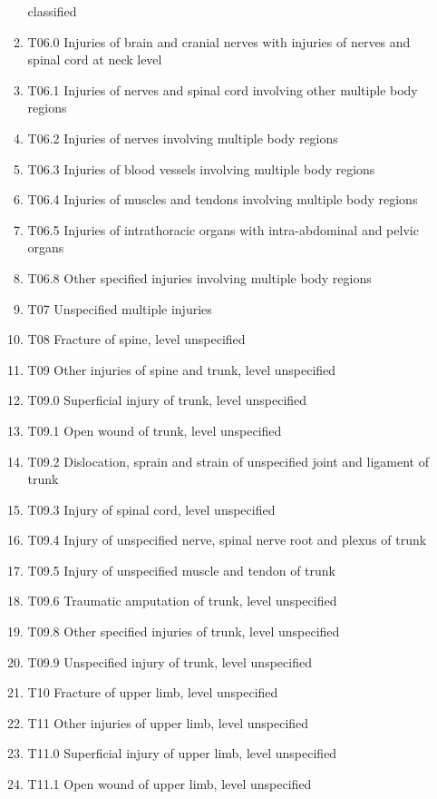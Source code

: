 \documentclass[
]{scrartcl}
\begin{document}
\begin{itemize}
\begin{enumerate}
    classified
  \item
    T06.0 Injuries of brain and cranial nerves with injuries of nerves
    and spinal cord at neck level
  \item
    T06.1 Injuries of nerves and spinal cord involving other multiple
    body regions
  \item
    T06.2 Injuries of nerves involving multiple body regions
  \item
    T06.3 Injuries of blood vessels involving multiple body regions
  \item
    T06.4 Injuries of muscles and tendons involving multiple body
    regions
  \item
    T06.5 Injuries of intrathoracic organs with intra-abdominal and
    pelvic organs
  \item
    T06.8 Other specified injuries involving multiple body regions
  \item
    T07 Unspecified multiple injuries
  \item
    T08 Fracture of spine, level unspecified
  \item
    T09 Other injuries of spine and trunk, level unspecified
  \item
    T09.0 Superficial injury of trunk, level unspecified
  \item
    T09.1 Open wound of trunk, level unspecified
  \item
    T09.2 Dislocation, sprain and strain of unspecified joint and
    ligament of trunk
  \item
    T09.3 Injury of spinal cord, level unspecified
  \item
    T09.4 Injury of unspecified nerve, spinal nerve root and plexus of
    trunk
  \item
    T09.5 Injury of unspecified muscle and tendon of trunk
  \item
    T09.6 Traumatic amputation of trunk, level unspecified
  \item
    T09.8 Other specified injuries of trunk, level unspecified
  \item
    T09.9 Unspecified injury of trunk, level unspecified
  \item
    T10 Fracture of upper limb, level unspecified
  \item
    T11 Other injuries of upper limb, level unspecified
  \item
    T11.0 Superficial injury of upper limb, level unspecified
  \item
    T11.1 Open wound of upper limb, level unspecified

\end{enumerate}
\end{itemize}
\end{document}
